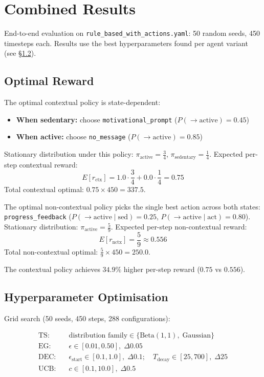 \documentclass[11pt]{article}
\begin{document}
\section{Combined Results}
\label{sec:results}

End-to-end evaluation on \texttt{rule\_based\_with\_actions.yaml}: 50 random seeds, 450 timesteps each. Results use the best hyperparameters found per agent variant (see \S\ref{sec:hyperparam}).

\subsection{Optimal Reward}

The optimal contextual policy is state-dependent:
\begin{itemize}
  \item \textbf{When sedentary:} choose \texttt{motivational\_prompt} ($P(\to\text{active}) = 0.45$)
  \item \textbf{When active:} choose \texttt{no\_message} ($P(\to\text{active}) = 0.85$)
\end{itemize}

Stationary distribution under this policy: $\pi_{\text{active}} = \frac{3}{4}$, $\pi_{\text{sedentary}} = \frac{1}{4}$. Expected per-step contextual reward:
\[
E[r_{\text{ctx}}] = 1.0 \cdot \frac{3}{4} + 0.0 \cdot \frac{1}{4} = 0.75
\]
Total contextual optimal: $0.75 \times 450 = 337.5$.

The optimal non-contextual policy picks the single best action across both states: \texttt{progress\_feedback} ($P(\to\text{active}\mid\text{sed})=0.25$, $P(\to\text{active}\mid\text{act})=0.80$). Stationary distribution: $\pi_{\text{active}} = \frac{5}{9}$. Expected per-step non-contextual reward:
\[
E[r_{\text{nctx}}] = \frac{5}{9} \approx 0.556
\]
Total non-contextual optimal: $\frac{5}{9} \times 450 = 250.0$.

The contextual policy achieves $34.9\%$ higher per-step reward ($0.75$ vs $0.556$).

\subsection{Hyperparameter Optimisation}
\label{sec:hyperparam}

Grid search (50 seeds, 450 steps, 288 configurations):

\[
\begin{aligned}
\text{TS:} &\quad \text{distribution family} \in \{\text{Beta}(1,1),\; \text{Gaussian}\} \\
\text{EG:} &\quad \epsilon \in [0.01, 0.50],\; \Delta 0.05 \\
\text{DEC:} &\quad \epsilon_{\text{start}} \in [0.1, 1.0],\; \Delta 0.1;\quad T_{\text{decay}} \in [25, 700],\; \Delta 25 \\
\text{UCB:} &\quad c \in [0.1, 10.0],\; \Delta 0.5
\end{aligned}
\]
\end{document}
